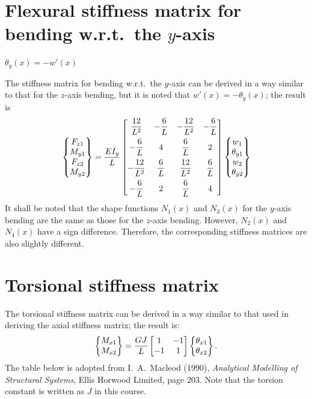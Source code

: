 \section{Flexural stiffness matrix for bending w.r.t.\ the \texorpdfstring{$y$}{y}-axis}
$\theta_y(x) = -w'(x)$
\begin{fig}
  
\end{fig}
The stiffness matrix for bending w.r.t.\ the $y$-axis can be derived in a way similar to that for the $z$-axis bending, but it is noted that $w'(x) = -\theta_y(x)$; the result is
\begin{equation}
  \begin{Bmatrix}F_{z1}\\ M_{y1}\\ F_{z2}\\ M_{y2}\end{Bmatrix} = \frac{EI_y}{L}
  \begin{bmatrix}
    \dfrac{12}{L^2} & -\dfrac6L & -\dfrac{12}{L^2} & -\dfrac6L\\[8pt]
    -\dfrac6L & 4 & \dfrac6L & 2\\[8pt]
    -\dfrac{12}{L^2} & \dfrac6L & \dfrac{12}{L^2} & \dfrac6L\\[8pt]
    -\dfrac6L & 2 & \dfrac6L & 4
  \end{bmatrix}
  \begin{Bmatrix}w_1\\ \theta_{y1}\\ w_2\\ \theta_{y2}\end{Bmatrix}
\end{equation}
It shall be noted that the shape functions $N_1(x)$ and $N_3(x)$ for the $y$-axis bending are the same as those for the $z$-axis bending. However, $N_2(x)$ and $N_4(x)$ have a sign difference. Therefore, the corresponding stiffness matrices are also slightly different.

\section{Torsional stiffness matrix}
The torsional stiffness matrix can be derived in a way similar to that used in deriving the axial stiffness matrix; the result is:
\begin{equation}
  \begin{Bmatrix}M_{x1}\\ M_{x2}\end{Bmatrix} = \frac{GJ}{L}\begin{bmatrix}1 & -1\\ -1 & 1\end{bmatrix}\begin{Bmatrix}\theta_{x1}\\ \theta_{x2}\end{Bmatrix}.
\end{equation}
The table below is adopted from I.~A.~Macleod (1990), \emph{Analytical Modelling of Structural Systems}, Ellis Horwood Limited, page 203. Note that the torsion constant is written as $J$ in this course.

